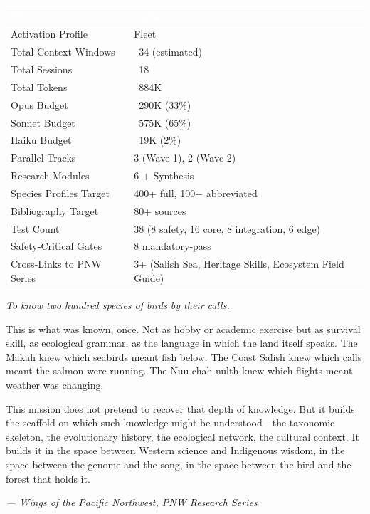 \documentclass[11pt,letterpaper]{article}
\newcommand{\tableheader}[1]{\textbf{\sffamily\textcolor{white}{#1}}}
\begin{document}
\begin{center}
\begin{tabularx}{\textwidth}{L{5cm}X}
\toprule
{}
\tableheader{Metric} & \tableheader{Value} \\
\midrule
Activation Profile & Fleet \\
Total Context Windows & ~34 (estimated) \\
Total Sessions & ~18 \\
Total Tokens & ~884K \\
Opus Budget & ~290K (33\%) \\
Sonnet Budget & ~575K (65\%) \\
Haiku Budget & ~19K (2\%) \\
Parallel Tracks & 3 (Wave 1), 2 (Wave 2) \\
Research Modules & 6 + Synthesis \\
Species Profiles Target & 400+ full, 100+ abbreviated \\
Bibliography Target & 80+ sources \\
Test Count & 38 (8 safety, 16 core, 8 integration, 6 edge) \\
Safety-Critical Gates & 8 mandatory-pass \\
Cross-Links to PNW Series & 3+ (Salish Sea, Heritage Skills, Ecosystem Field Guide) \\
\bottomrule
\end{tabularx}
\end{center}

\begin{quotebox}
\textit{To know two hundred species of birds by their calls.}

\vspace{0.5em}

This is what was known, once. Not as hobby or academic exercise but as survival skill, as ecological grammar, as the language in which the land itself speaks. The Makah knew which seabirds meant fish below. The Coast Salish knew which calls meant the salmon were running. The Nuu-chah-nulth knew which flights meant weather was changing.

This mission does not pretend to recover that depth of knowledge. But it builds the scaffold on which such knowledge might be understood---the taxonomic skeleton, the evolutionary history, the ecological network, the cultural context. It builds it in the space between Western science and Indigenous wisdom, in the space between the genome and the song, in the space between the bird and the forest that holds it.

\vspace{0.5em}

\hfill\textit{--- Wings of the Pacific Northwest, PNW Research Series}
\end{quotebox}
\end{document}
